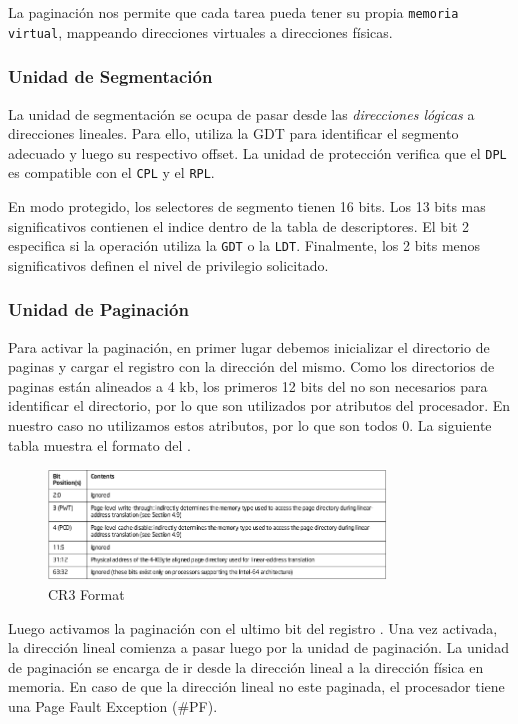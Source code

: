 La paginación nos permite que cada tarea pueda tener su propia \texttt{memoria virtual}, mappeando direcciones virtuales a direcciones físicas.

\subsubsection{Unidad de Segmentación}

La unidad de segmentación se ocupa de pasar desde las \textit{direcciones lógicas} a direcciones lineales. Para ello, utiliza la GDT para identificar el segmento adecuado y luego su respectivo offset. La unidad de protección verifica que el \texttt{DPL} es compatible con el \texttt{CPL} y el \texttt{RPL}.

En modo protegido, los selectores de segmento tienen 16 bits. Los 13 bits mas significativos contienen el indice dentro de la tabla de descriptores. El bit 2 especifica si la operación utiliza la \texttt{GDT} o la \texttt{LDT}. Finalmente, los 2 bits menos significativos definen el nivel de privilegio solicitado.

\subsubsection{Unidad de Paginación}

Para activar la paginación, en primer lugar debemos inicializar el directorio de paginas y cargar el registro  con la dirección del mismo. Como los directorios de paginas están alineados a 4 kb, los primeros 12 bits del  no son necesarios para identificar el directorio, por lo que son utilizados por atributos del procesador. En nuestro caso no utilizamos estos atributos, por lo que son todos 0. La siguiente tabla muestra el formato del .

\begin{figure}[H]
  \centering
    \includegraphics[width=0.8\textwidth]{images/cr3}
  \caption{CR3 Format}
\end{figure}

Luego activamos la paginación con el ultimo bit del registro . Una vez activada, la dirección lineal comienza a pasar luego por la unidad de paginación. La unidad de paginación se encarga de ir desde la dirección lineal a la dirección física en memoria. En caso de que la dirección lineal no este paginada, el procesador tiene una Page Fault Exception (\#PF).

